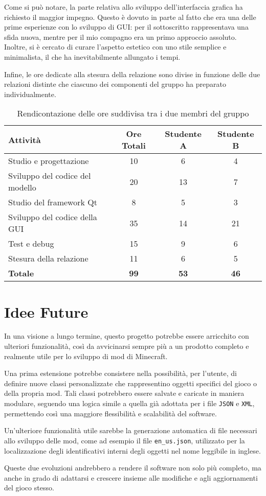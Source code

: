 \documentclass[a4paper,12pt]{article}
\begin{document}
Come si può notare, la parte relativa allo sviluppo dell’interfaccia grafica ha richiesto il maggior impegno. Questo è dovuto in parte al fatto che era una delle prime esperienze con lo sviluppo di GUI: per il sottoscritto rappresentava una sfida nuova, mentre per il mio compagno era un primo approccio assoluto. Inoltre, si è cercato di curare l’aspetto estetico con uno stile semplice e minimalista, il che ha inevitabilmente allungato i tempi.

Infine, le ore dedicate alla stesura della relazione sono divise in funzione delle due relazioni distinte che ciascuno dei componenti del gruppo ha preparato individualmente.

\begin{table}[H]
\centering
\begin{tabular}{|l|c|c|c|}
\hline
\textbf{Attività} & \textbf{Ore Totali} & \textbf{Studente A} & \textbf{Studente B} \\
\hline
Studio e progettazione            & 10 & 6 & 4 \\
Sviluppo del codice del modello   & 20 & 13 & 7 \\
Studio del framework Qt           & 8  & 5 & 3 \\
Sviluppo del codice della GUI     & 35 & 14 & 21 \\
Test e debug                      & 15 & 9 & 6 \\
Stesura della relazione           & 11 & 6 & 5 \\
\hline
\textbf{Totale}                   & \textbf{99} & \textbf{53} & \textbf{46} \\
\hline
\end{tabular}
\caption{Rendicontazione delle ore suddivisa tra i due membri del gruppo}
\label{tab:rendicontazione}
\end{table}

\section{Idee Future}

In una visione a lungo termine, questo progetto potrebbe essere arricchito con ulteriori funzionalità, così da avvicinarsi sempre più a un prodotto completo e realmente utile per lo sviluppo di mod di Minecraft.

Una prima estensione potrebbe consistere nella possibilità, per l'utente, di definire nuove classi personalizzate che rappresentino oggetti specifici del gioco o della propria mod. Tali classi potrebbero essere salvate e caricate in maniera modulare, seguendo una logica simile a quella già adottata per i file \texttt{JSON} e \texttt{XML}, permettendo così una maggiore flessibilità e scalabilità del software.

Un’ulteriore funzionalità utile sarebbe la generazione automatica di file necessari allo sviluppo delle mod, come ad esempio il file \texttt{en\_us.json}, utilizzato per la localizzazione degli identificativi interni degli oggetti nel nome leggibile in inglese.

Queste due evoluzioni andrebbero a rendere il software non solo più completo, ma anche in grado di adattarsi e crescere insieme alle modifiche e agli aggiornamenti del gioco stesso.
\end{document}
